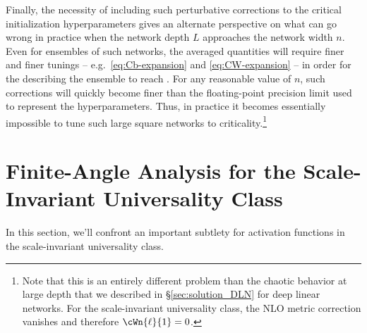 Finally, the necessity of including such perturbative corrections to the critical initialization hyperparameters 
gives an alternate perspective on what can go wrong in practice when the network depth $L$ approaches the network width $n$. Even for ensembles of such networks, the averaged quantities will require finer and finer tunings -- e.g.~\eqref{eq:Cb-expansion} and \eqref{eq:CW-expansion} -- in order for the  describing the ensemble to reach . For any reasonable value of $n$, such corrections will quickly become finer than the floating-point precision limit used to represent the hyperparameters. Thus, in practice it becomes essentially impossible to tune
such large square networks to criticality.\footnote{Note that this is an entirely different problem than the chaotic behavior at large depth that we described in \S\ref{sec:solution_DLN} for deep linear networks. For the scale-invariant universality class, the NLO metric correction vanishes and therefore $\cWn{\ell}{1}=0$.
}




























\section{Finite-Angle Analysis for the Scale-Invariant Universality Class}\label{sec:finite_angle}
In this section, we'll confront an important subtlety for activation functions in the scale-invariant universality class.

